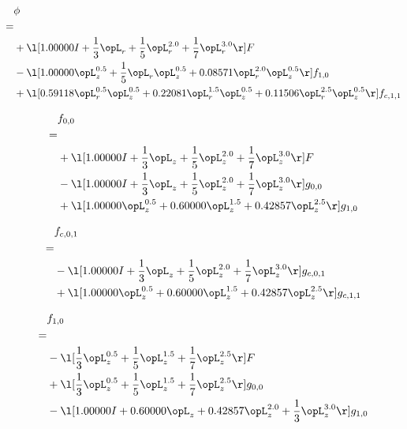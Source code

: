\begin{alignat}{2} 
\label{eq:scalarFlux_0} 
& \phi \nonumber \\ 
 = \\ 
& + \l[  1.00000 I + \frac{1}{3} \opL_r + \frac{1}{5} \opL_r^{2.0} + \frac{1}{7} \opL_r^{3.0}  \r] F \nonumber \\ 
& - \l[  1.00000 \opL_z^{0.5} + \frac{1}{5} \opL_r \opL_z^{0.5} +  0.08571 \opL_r^{2.0} \opL_z^{0.5}  \r] f_{1,0} \nonumber \\ 
& + \l[  0.59118 \opL_r^{0.5} \opL_z^{0.5} +  0.22081 \opL_r^{1.5} \opL_z^{0.5} +  0.11506 \opL_r^{2.5} \opL_z^{0.5}  \r] f_{c,1,1} \nonumber \\ 
\end{alignat} 


\begin{alignat}{2} 
\label{eq:f_00_0} 
& f_{0,0} \nonumber \\ 
 = \\ 
& + \l[  1.00000 I + \frac{1}{3} \opL_z + \frac{1}{5} \opL_z^{2.0} + \frac{1}{7} \opL_z^{3.0}  \r] F \nonumber \\ 
& - \l[  1.00000 I + \frac{1}{3} \opL_z + \frac{1}{5} \opL_z^{2.0} + \frac{1}{7} \opL_z^{3.0}  \r] g_{0,0} \nonumber \\ 
& + \l[  1.00000 \opL_z^{0.5} +  0.60000 \opL_z^{1.5} +  0.42857 \opL_z^{2.5}  \r] g_{1,0} \nonumber \\ 
\end{alignat} 


\begin{alignat}{2} 
\label{eq:f_01_0} 
& f_{c,0,1} \nonumber \\ 
 = \\ 
& - \l[  1.00000 I + \frac{1}{3} \opL_z + \frac{1}{5} \opL_z^{2.0} + \frac{1}{7} \opL_z^{3.0}  \r] g_{c,0,1} \nonumber \\ 
& + \l[  1.00000 \opL_z^{0.5} +  0.60000 \opL_z^{1.5} +  0.42857 \opL_z^{2.5}  \r] g_{c,1,1} \nonumber \\ 
\end{alignat} 


\begin{alignat}{2} 
\label{eq:f_10_0} 
& f_{1,0} \nonumber \\ 
 = \\ 
& - \l[ \frac{1}{3} \opL_z^{0.5} + \frac{1}{5} \opL_z^{1.5} + \frac{1}{7} \opL_z^{2.5}  \r] F \nonumber \\ 
& + \l[ \frac{1}{3} \opL_z^{0.5} + \frac{1}{5} \opL_z^{1.5} + \frac{1}{7} \opL_z^{2.5}  \r] g_{0,0} \nonumber \\ 
& - \l[  1.00000 I +  0.60000 \opL_z +  0.42857 \opL_z^{2.0} + \frac{1}{3} \opL_z^{3.0}  \r] g_{1,0} \nonumber \\ 
\end{alignat} 


